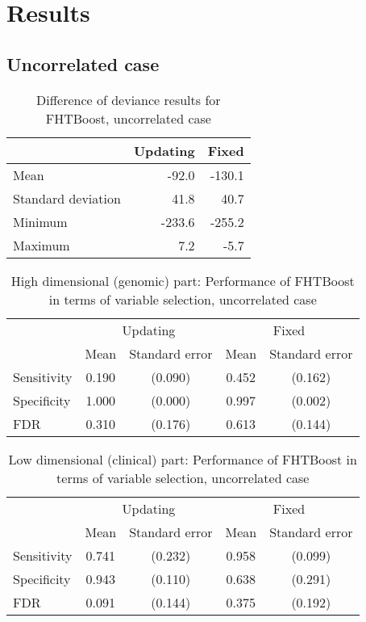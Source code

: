 \section{Results}
\subsection{Uncorrelated case}

\begin{table}
\caption{Difference of deviance results for FHTBoost, uncorrelated case}
\label{table:uncorrelated-deviance}
\centering
\begin{tabular}{l|rr}
\toprule
& Updating & Fixed \\
\hline
Mean               &  -92.0  & -130.1  \\
Standard deviation &   41.8  &   40.7  \\
Minimum            & -233.6  & -255.2  \\
Maximum            &    7.2  &   -5.7  \\
\bottomrule
\end{tabular}
\end{table}

\begin{table}
\caption{High dimensional (genomic) part: Performance of FHTBoost in terms of variable selection, uncorrelated case}
\label{table:uncorrelated-y0}
\centering
\begin{tabular}{l|cc|cc}
\toprule
& \multicolumn{2}{c}{Updating} & \multicolumn{2}{c}{Fixed} \\
& Mean & Standard error & Mean & Standard error \\
\hline
Sensitivity & 0.190 & (0.090) & 0.452 & (0.162) \\
Specificity & 1.000 & (0.000) & 0.997 & (0.002) \\
FDR         & 0.310 & (0.176) & 0.613 & (0.144) \\
\bottomrule
\end{tabular}
\end{table}

\begin{table}
\caption{Low dimensional (clinical) part: Performance of FHTBoost in terms of variable selection, uncorrelated case}
\label{table:uncorrelated-mu}
\centering
\begin{tabular}{l|cc|cc}
\toprule
& \multicolumn{2}{c}{Updating} & \multicolumn{2}{c}{Fixed} \\
& Mean & Standard error & Mean & Standard error \\
\hline
Sensitivity & 0.741 & (0.232) & 0.958 & (0.099) \\
Specificity & 0.943 & (0.110) & 0.638 & (0.291) \\
FDR         & 0.091 & (0.144) & 0.375 & (0.192) \\
\bottomrule
\end{tabular}
\end{table}

